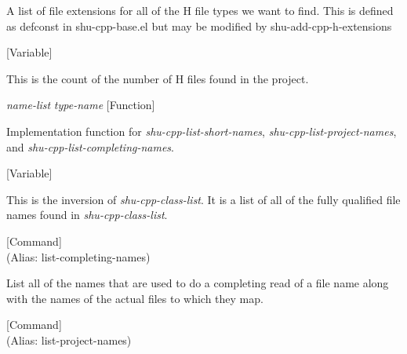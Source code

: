 \begin{doc-string}
A list of file extensions for all of the H file types we want to find.  This is defined
as defconst in shu-cpp-base.el but may be modified by shu-add-cpp-h-extensions
\end{doc-string}

\vspace{1em}
\noindent
{}
\usebox{\funcname}
 \hfill [Variable]

\begin{doc-string}
This is the count of the number of H files found in the project.
\end{doc-string}

\vspace{1em}
\noindent
{}
\usebox{\funcname}\emph{name-list} \emph{type-name}
 \hfill [Function]

\begin{doc-string}
Implementation function for \emph{shu-cpp-list-short-names},
\emph{shu-cpp-list-project-names}, and \emph{shu-cpp-list-completing-names}.
\end{doc-string}

\vspace{1em}
\noindent
{}
\usebox{\funcname}
 \hfill [Variable]

\begin{doc-string}
This is the inversion of \emph{shu-cpp-class-list}.  It is a list of all of the
fully qualified file names found in \emph{shu-cpp-class-list}.
\end{doc-string}

\vspace{1em}
\noindent
{}
\usebox{\funcname}
 \hfill [Command]\\%
 (Alias: list-completing-names)

\begin{doc-string}
List all of the names that are used to do a completing read of a file name
along with the names of the actual files to which they map.
\end{doc-string}

\vspace{1em}
\noindent
{}
\usebox{\funcname}
 \hfill [Command]\\%
 (Alias: list-project-names)

